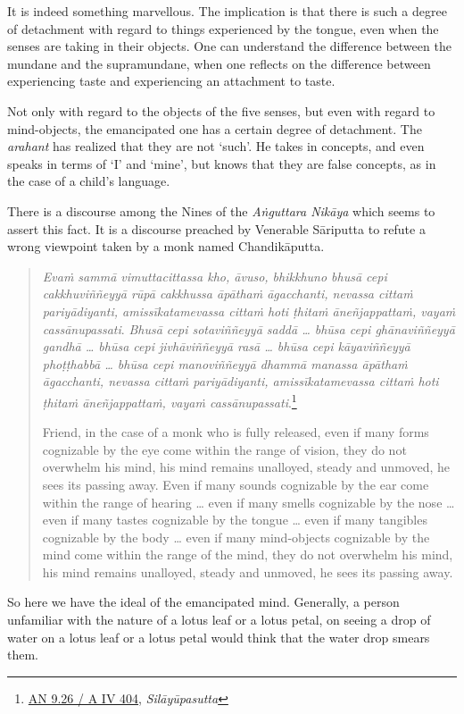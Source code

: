 It is indeed something marvellous. The implication is that there is such a degree of detachment with regard to things experienced by the tongue, even when the senses are taking in their objects. One can understand the difference between the mundane and the supramundane, when one reflects on the difference between experiencing taste and experiencing an attachment to taste.

Not only with regard to the objects of the five senses, but even with regard to mind-objects, the emancipated one has a certain degree of detachment. The \emph{arahant} has realized that they are not `such'. He takes in concepts, and even speaks in terms of `I' and `mine', but knows that they are false concepts, as in the case of a child's language.

There is a discourse among the Nines of the \emph{Aṅguttara Nikāya} which seems to assert this fact. It is a discourse preached by Venerable Sāriputta to refute a wrong viewpoint taken by a monk named Chandikāputta.

\begin{quote}
\emph{Evaṁ sammā vimuttacittassa kho, āvuso, bhikkhuno bhusā cepi cakkhuviññeyyā rūpā cakkhussa āpāthaṁ āgacchanti, nevassa cittaṁ pariyādiyanti, amissīkatamevassa cittaṁ hoti ṭhitaṁ āneñjappattaṁ, vayaṁ cassānupassati}. \emph{Bhusā cepi sotaviññeyyā saddā \ldots{} bhūsa cepi ghānaviññeyyā gandhā \ldots{} bhūsa cepi jivhāviññeyyā rasā \ldots{} bhūsa cepi kāyaviññeyyā phoṭṭhabbā \ldots{} bhūsa cepi manoviññeyyā dhammā manassa āpāthaṁ āgacchanti, nevassa cittaṁ pariyādiyanti, amissīkatamevassa cittaṁ hoti ṭhitaṁ āneñjappattaṁ, vayaṁ cassānupassati}.\footnote{\href{https://suttacentral.net/an9.26/pli/ms}{AN 9.26 / A IV 404}, \emph{Silāyūpasutta}}

Friend, in the case of a monk who is fully released, even if many forms cognizable by the eye come within the range of vision, they do not overwhelm his mind, his mind remains unalloyed, steady and unmoved, he sees its passing away. Even if many sounds cognizable by the ear come within the range of hearing \ldots{} even if many smells cognizable by the nose \ldots{} even if many tastes cognizable by the tongue \ldots{} even if many tangibles cognizable by the body \ldots{} even if many mind-objects cognizable by the mind come within the range of the mind, they do not overwhelm his mind, his mind remains unalloyed, steady and unmoved, he sees its passing away.
\end{quote}

So here we have the ideal of the emancipated mind. Generally, a person unfamiliar with the nature of a lotus leaf or a lotus petal, on seeing a drop of water on a lotus leaf or a lotus petal would think that the water drop smears them.

